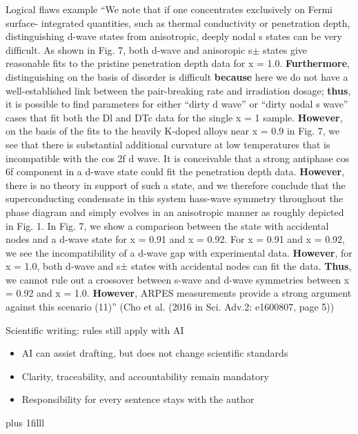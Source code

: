 \documentclass[aspectratio=169]{beamer}
\newcommand{\btVFill}{\vskip0pt plus 1filll}
\begin{document}
\begin{frame}{Logical flaws example}
  \vspace{-0.3cm}
\footnotesize{``We note that if one concentrates exclusively on Fermi surface- integrated quantities, such as thermal conductivity or penetration depth, distinguishing d-wave states from anisotropic, deeply nodal s states can be very difficult. As shown in Fig. 7, both d-wave and anisoropic s$\pm$ states give reasonable fits to the pristine penetration depth data for x = 1.0. \textbf{Furthermore}, distinguishing on the basis of disorder is difficult \textbf{because} here we do not have a well-established link between the pair-breaking rate and irradiation dosage; \textbf{thus}, it is possible to find parameters for either ``dirty d wave'' or ``dirty nodal s wave'' cases that fit both the Dl and DTc data for the single x = 1 sample. \textbf{However}, on the basis of the fits to the heavily K-doped alloys near x = 0.9 in Fig. 7, we see that there is substantial additional curvature at low temperatures that is incompatible with the cos 2f d wave. It is conceivable that a strong antiphase cos 6f component in a d-wave state could fit the penetration depth data. \textbf{However}, there is no theory in support of such a state, and we therefore conclude that the superconducting condensate in this system hass-wave symmetry throughout the phase diagram and simply evolves in an anisotropic manner as roughly depicted in Fig. 1. In Fig. 7, we show a comparison between the state with accidental nodes and a d-wave state for x = 0.91 and x = 0.92. For x = 0.91 and x = 0.92, we see the incompatibility of a d-wave gap with experimental data. \textbf{However}, for x = 1.0, both d-wave and s± states with accidental nodes can fit the data. \textbf{Thus}, we cannot rule out a crossover between s-wave and d-wave symmetries between x = 0.92 and x = 1.0. \textbf{However}, ARPES measurements provide a strong argument against this scenario (11)'' (Cho et al. (2016 in Sci. Adv.2: e1600807, page 5))}
\end{frame}

\begin{frame}{Scientific writing: rules still apply with AI}
  \begin{itemize}
    \item AI can assist drafting, but does not change scientific standards
    \item Clarity, traceability, and accountability remain mandatory
    \item Responsibility for every sentence stays with the author
  \end{itemize}
  \btVFill
\end{frame}
\end{document}
